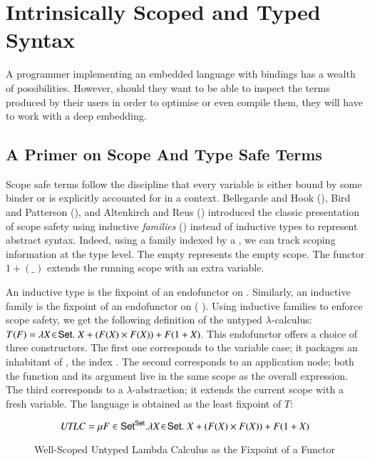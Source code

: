\chapter{Intrinsically Scoped and Typed Syntax}
\label{sec:scopedtypedterms}

A programmer implementing an embedded language with bindings has a wealth of
possibilities. However, should they want to be able to inspect the terms produced
by their users in order to optimise or even compile them, they will have to work
with a deep embedding.

\section{A Primer on Scope And Type Safe Terms}\label{section:primer-term}

Scope safe terms follow the discipline that every variable is either bound by
some binder or is explicitly accounted for in a context. Bellegarde and Hook
(\citeyear{BELLEGARDE1994287}), Bird and Patterson (\citeyear{bird_paterson_1999}),
and Altenkirch and Reus (\citeyear{altenkirch1999monadic}) introduced the classic
presentation of scope safety using inductive \emph{families}
(\cite{dybjer1994inductive}) instead of inductive types to represent abstract
syntax. Indeed, using a family indexed by a , we can track scoping
information at the type level. The empty  represents the empty scope.
The functor $1 + (\_)$ extends the running scope with an extra variable.

An inductive type is the fixpoint of an endofunctor on . Similarly, an
inductive family is the fixpoint of an endofunctor on ({  }).
Using inductive families to enforce scope safety, we get the following definition
of the untyped $\lambda$-calculus:
$T(F) = \lambda X \!\in\! \AD{Set}.\; X + (F(X) \times F(X)) + F(1 + X)$.
This endofunctor offers a choice of three constructors.  The first one corresponds
to the variable case; it packages an inhabitant of , the index .
The second corresponds to an application node; both the function and its argument
live in the same scope as the overall expression. The third corresponds to a
$\lambda$-abstraction; it extends the current scope with a fresh variable.
The language is obtained as the least fixpoint of $T$:

\begin{figure}[h]
\[
   \mathit{UTLC} = \mu F \in \AD{Set}^{\AD{Set}}.
   \lambda X \!\in\! \AD{Set}.\; X + (F(X) \times F(X)) + F(1 + X)
\]
\caption{Well-Scoped Untyped Lambda Calculus as the Fixpoint of a Functor}
\end{figure}

